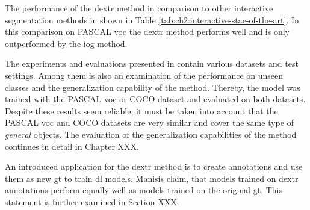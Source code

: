 The performance of the \gls{dextr} method in comparison to other interactive segmentation methods in shown in Table \ref{tab:ch2:interactive-stae-of-the-art}.
In this comparison on PASCAL \gls{voc} the \gls{dextr} method performs well and is only outperformed by the \gls{iog} method.

The experiments and evaluations presented in \cite{Man18-DEXTR} contain various datasets and test settings.
Among them is also an examination of the performance on unseen classes and the generalization capability of the method.
Thereby, the model was trained with the PASCAL \gls{voc} or COCO dataset and evaluated on both datasets.
Despite these results seem reliable, it must be taken into account that the PASCAL \gls{voc} and COCO datasets are very similar and cover the same type of \textit{general} objects.
The evaluation of the generalization capabilities of the method continues in detail in Chapter XXX.

An introduced application for the \gls{dextr} method is to create annotations and use them as new \gls{gt} to train \gls{dl} models.
Manisis \etal claim, that models trained on \gls{dextr} annotations perform equally well as models trained on the original \gls{gt}\cite{Man18-DEXTR}.
This statement is further examined in Section XXX.
